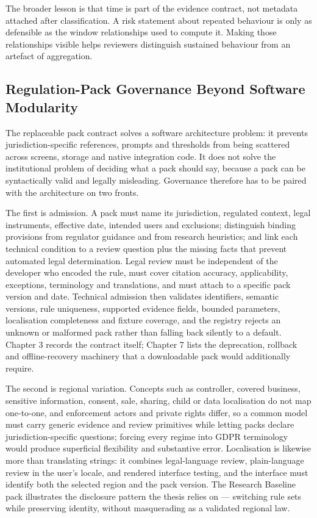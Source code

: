 The broader lesson is that time is part of the evidence contract, not metadata attached after classification. A risk statement about repeated behaviour is only as defensible as the window relationships used to compute it. Making those relationships visible helps reviewers distinguish sustained behaviour from an artefact of aggregation.

\subsection{Regulation-Pack Governance Beyond Software Modularity}

The replaceable pack contract solves a software architecture problem: it prevents jurisdiction-specific references, prompts and thresholds from being scattered across screens, storage and native integration code. It does not solve the institutional problem of deciding what a pack should say, because a pack can be syntactically valid and legally misleading. Governance therefore has to be paired with the architecture on two fronts.

The first is admission. A pack must name its jurisdiction, regulated context, legal instruments, effective date, intended users and exclusions; distinguish binding provisions from regulator guidance and from research heuristics; and link each technical condition to a review question plus the missing facts that prevent automated legal determination. Legal review must be independent of the developer who encoded the rule, must cover citation accuracy, applicability, exceptions, terminology and translations, and must attach to a specific pack version and date. Technical admission then validates identifiers, semantic versions, rule uniqueness, supported evidence fields, bounded parameters, localisation completeness and fixture coverage, and the registry rejects an unknown or malformed pack rather than falling back silently to a default. Chapter 3 records the contract itself; Chapter 7 lists the deprecation, rollback and offline-recovery machinery that a downloadable pack would additionally require.

The second is regional variation. Concepts such as controller, covered business, sensitive information, consent, sale, sharing, child or data localisation do not map one-to-one, and enforcement actors and private rights differ, so a common model must carry generic evidence and review primitives while letting packs declare jurisdiction-specific questions; forcing every regime into GDPR terminology would produce superficial flexibility and substantive error. Localisation is likewise more than translating strings: it combines legal-language review, plain-language review in the user's locale, and rendered interface testing, and the interface must identify both the selected region and the pack version. The Research Baseline pack illustrates the disclosure pattern the thesis relies on — switching rule sets while preserving identity, without masquerading as a validated regional law.

